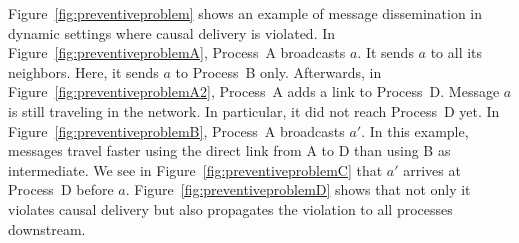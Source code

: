 



\begin{figure*}
  \begin{center}
    \hspace{20pt}
    \hspace{20pt}
    \hspace{20pt}
    \hspace{20pt}
    \caption{\label{fig:preventiveproblem}Preventive causal broadcast may
      violate causal order in dynamic settings.}
  \end{center}
\end{figure*}

Figure~\ref{fig:preventiveproblem} shows an example of message dissemination in
dynamic settings where causal delivery is violated. In
Figure~\ref{fig:preventiveproblemA}, Process~A broadcasts $a$. It sends $a$ to
all its neighbors. Here, it sends $a$ to Process~B only.  Afterwards, in
Figure~\ref{fig:preventiveproblemA2}, Process~A adds a link to
Process~D. Message $a$ is still traveling in the network. In particular, it did
not reach Process~D yet. In Figure~\ref{fig:preventiveproblemB}, Process~A
broadcasts $a'$. In this example, messages travel faster using the direct link
from A to D than using B as intermediate.  We see in
Figure~\ref{fig:preventiveproblemC} that $a'$ arrives at Process~D before
$a$. Figure~\ref{fig:preventiveproblemD} shows that not only it violates causal
delivery but also propagates the violation to all processes downstream.

